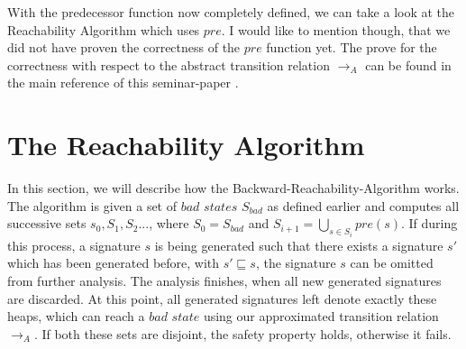 \noindent
With the predecessor function now completely defined, we can take a look at the Reachability Algorithm which uses $pre$. 
I would like to mention though, that we did not have proven the correctness of the $pre$ function yet. The prove for the correctness
with respect to the abstract transition relation $\longrightarrow_A$ can be found in the main reference of this seminar-paper \cite{abdulla2013monotonic}.

\section{The Reachability Algorithm}
In this section, we will describe how the Backward-Reachability-Algorithm works. The algorithm is given a set of $bad$ $states$ 
$S_{bad}$ as defined earlier and computes all successive sets $s_0, S_1, S_2 ...$, where $S_0 = S_{bad}$ and
$S_{i + 1} = \bigcup_{s \in S_i} pre(s)$. If during this process, a signature $s$ is being generated such that there exists a signature
$s'$ which has been generated before, with $s' \sqsubseteq s$, the signature $s$ can be omitted from further analysis. The analysis
finishes, when all new generated signatures are discarded. At this point, all generated signatures left denote exactly these heaps,
which can reach a $bad$ $state$ using our approximated transition relation $\longrightarrow_A$. If both these sets are disjoint, 
the safety property holds, otherwise it fails. 

